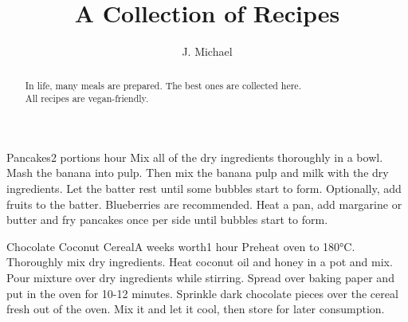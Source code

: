 \documentclass[]{article}
\title{A Collection of Recipes}
\author{J. Michael}
\begin{document}
\maketitle

\tableofcontents

\begin{abstract}
In life, many meals are prepared.
The best ones are collected here. \\
All recipes are vegan-friendly.
\end{abstract}

\begin{recipe}{Pancakes}{2 portions}{ hour}
	Mix all of the dry ingredients thoroughly in a bowl.
	Mash the banana into pulp.
	Then mix the banana pulp and milk with the dry ingredients.
	Let the batter rest until some bubbles start to form.
	Optionally, add fruits to the batter.
	Blueberries are recommended.
	Heat a pan, add margarine or butter and fry pancakes once per side until bubbles start to form.
\end{recipe}

\begin{recipe}{Chocolate Coconut Cereal}{A weeks worth}{1 hour}
	Preheat oven to 180°C.
	Thoroughly mix dry ingredients.
	Heat coconut oil and honey in a pot and mix.
	Pour mixture over dry ingredients while stirring.
	\newstep
	Spread over baking paper and put in the oven for 10-12 minutes.
	Sprinkle dark chocolate pieces over the cereal fresh out of the oven.
	Mix it and let it cool, then store for later consumption.
\end{recipe}
\end{document}
